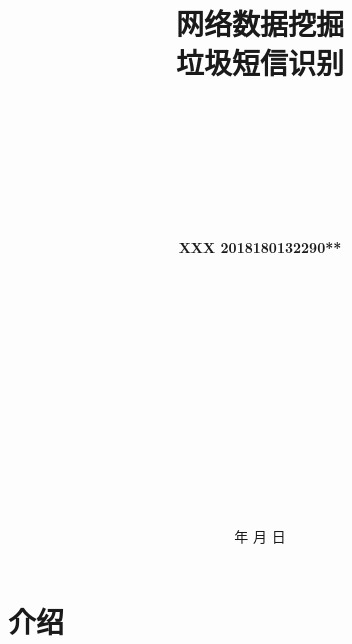 \documentclass[a4paper]{article}
\begin{document}
\renewcommand{\contentsname}{目\ 录}
\renewcommand{\appendixname}{附录}
\renewcommand{\appendixpagename}{附录}
\renewcommand{\refname}{参考文献} 
\renewcommand{\figurename}{图}
\renewcommand{\tablename}{表}
\renewcommand{\today}{\number\year 年 \number\month 月 \number\day 日}
\begin{titlepage}
\title{{\Huge \textbf{网络数据挖掘}{\large\linebreak\\}}{\Large \textbf{垃圾短信识别}\linebreak\linebreak}}


\author{\\
\\ \\ \\ \\ \\ \\
\textbf{XXX 2018180132290**}  \\
\\ \\ \\ \\ \\ \\ \\  \\ \\  \\ \\ \\ \\}

\date{\today}

\maketitle
\thispagestyle{empty}
\end{titlepage}


\newpage

\thispagestyle{empty}
\begin{center}
\tableofcontents\label{c}
\end{center}
\thispagestyle{empty}
\setcounter{page}{0}
\newpage


\section{介绍}
\end{document}
